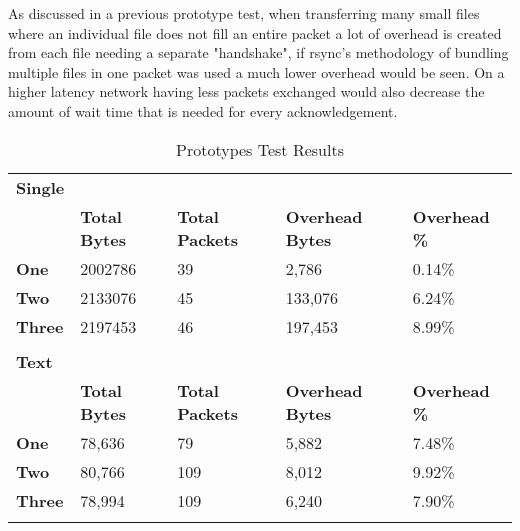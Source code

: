 As discussed in a previous prototype test, when transferring many small files where an individual file does not fill an entire packet a lot of overhead is created from each file needing a separate "handshake", if rsync's methodology of bundling multiple files in one packet was used a much lower overhead would be seen. On a higher latency network having less packets exchanged would also decrease the amount of wait time that is needed for every acknowledgement.


\begin{table}[h!]
	\caption{Prototypes Test Results}
	\label{tab:prototypes-test-results}
	\centering
	\begin{tabular}{l l l l l}
		\textbf{Single}     &                      &                        &                         &                      \\
		\textbf{}           & \textbf{Total Bytes} & \textbf{Total Packets} & \textbf{Overhead Bytes} & \textbf{Overhead \%} \\
		\hline
		\textbf{One}        & 2002786              & 39                     & 2,786                   & 0.14\%               \\
		\hline
		\textbf{Two}        & 2133076              & 45                     & 133,076                 & 6.24\%               \\
		\hline
		\textbf{Three}      & 2197453              & 46                     & 197,453                 & 8.99\%               \\
		\hline
		                    &                      &                        &                         &                      \\
		\textbf{Text}       &                      &                        &                         &                      \\
		\textbf{}           & \textbf{Total Bytes} & \textbf{Total Packets} & \textbf{Overhead Bytes} & \textbf{Overhead \%} \\
		\hline
		\textbf{One}        & 78,636               & 79                     & 5,882                   & 7.48\%               \\
		\hline
		\textbf{Two}        & 80,766               & 109                    & 8,012                   & 9.92\%               \\
		\hline
		\textbf{Three}      & 78,994               & 109                    & 6,240                   & 7.90\%               \\
		\hline
		                    &                      &                        &                         &                      \\

\end{tabular}
\end{table}

